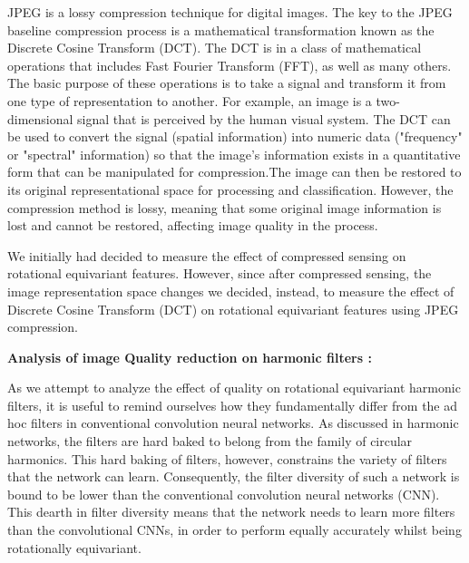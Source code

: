 \documentclass{article}
\begin{document}
JPEG is a lossy compression technique for digital images. The key to the JPEG baseline compression process is a mathematical transformation known as the Discrete Cosine Transform (DCT). The DCT is in a class of mathematical operations that includes Fast Fourier Transform (FFT), as well as many others. The basic purpose of these operations is to take a signal and transform it from one type of representation to another. For example, an image is a two-dimensional signal that is perceived by the human visual system. The DCT can be used to convert the signal (spatial information) into numeric data ("frequency" or "spectral" information) so that the image’s information exists in a quantitative form that can be manipulated for compression.The image can then be restored to its original representational space for processing and classification. However, the compression method is lossy, meaning that some original image information is lost and cannot be restored, affecting image quality in the process.

We initially had decided to measure the effect of compressed sensing on rotational equivariant features. However, since after compressed sensing, the image representation space changes we decided, instead, to measure the effect of Discrete Cosine Transform (DCT) on rotational equivariant features using JPEG compression.


\textbf{Analysis of image Quality reduction on harmonic
filters :}

As we attempt to analyze the effect of quality on rotational equivariant harmonic filters, it is useful to remind ourselves how they fundamentally differ from the ad hoc filters in conventional convolution neural networks. As discussed in harmonic networks, the filters are hard baked to belong from the family of circular harmonics. This hard baking of filters, however, constrains the variety of filters that the network can learn. Consequently, the filter diversity of such a network is bound to be lower than the conventional convolution neural networks (CNN). This dearth in filter diversity means that the network needs to learn more filters than the convolutional CNNs, in order to perform equally accurately whilst being rotationally equivariant.
\end{document}
